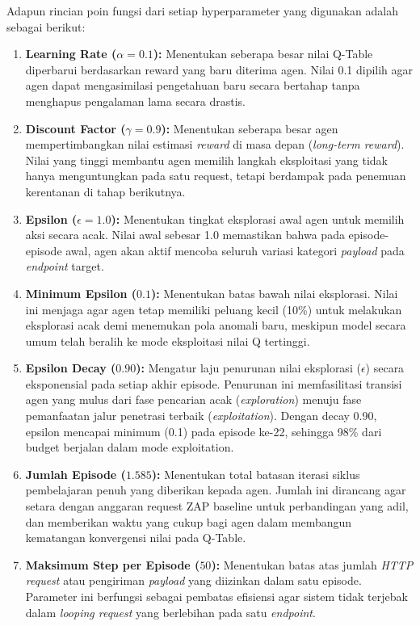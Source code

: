 Adapun rincian poin fungsi dari setiap hyperparameter yang digunakan adalah sebagai berikut:

\begin{enumerate}
    \item \textbf{Learning Rate ($\alpha = 0.1$):} Menentukan seberapa besar nilai Q-Table diperbarui berdasarkan reward yang baru diterima agen. Nilai 0.1 dipilih agar agen dapat mengasimilasi pengetahuan baru secara bertahap tanpa menghapus pengalaman lama secara drastis.
    \item \textbf{Discount Factor ($\gamma = 0.9$):} Menentukan seberapa besar agen mempertimbangkan nilai estimasi \textit{reward} di masa depan (\textit{long-term reward}). Nilai yang tinggi membantu agen memilih langkah eksploitasi yang tidak hanya menguntungkan pada satu request, tetapi berdampak pada penemuan kerentanan di tahap berikutnya.
    \item \textbf{Epsilon ($\epsilon = 1.0$):} Menentukan tingkat eksplorasi awal agen untuk memilih aksi secara acak. Nilai awal sebesar 1.0 memastikan bahwa pada episode-episode awal, agen akan aktif mencoba seluruh variasi kategori \textit{payload} pada \textit{endpoint} target.
    \item \textbf{Minimum Epsilon ($0.1$):} Menentukan batas bawah nilai eksplorasi. Nilai ini menjaga agar agen tetap memiliki peluang kecil (10\%) untuk melakukan eksplorasi acak demi menemukan pola anomali baru, meskipun model secara umum telah beralih ke mode eksploitasi nilai Q tertinggi.
    \item \textbf{Epsilon Decay ($0.90$):} Mengatur laju penurunan nilai eksplorasi ($\epsilon$) secara eksponensial pada setiap akhir episode. Penurunan ini memfasilitasi transisi agen yang mulus dari fase pencarian acak (\textit{exploration}) menuju fase pemanfaatan jalur penetrasi terbaik (\textit{exploitation}). Dengan decay 0.90, epsilon mencapai minimum (0.1) pada episode ke-22, sehingga 98\% dari budget berjalan dalam mode exploitation.
    \item \textbf{Jumlah Episode ($1.585$):} Menentukan total batasan iterasi siklus pembelajaran penuh yang diberikan kepada agen. Jumlah ini dirancang agar setara dengan anggaran request ZAP baseline untuk perbandingan yang adil, dan memberikan waktu yang cukup bagi agen dalam membangun kematangan konvergensi nilai pada Q-Table.
    \item \textbf{Maksimum Step per Episode ($50$):} Menentukan batas atas jumlah \textit{HTTP request} atau pengiriman \textit{payload} yang diizinkan dalam satu episode. Parameter ini berfungsi sebagai pembatas efisiensi agar sistem tidak terjebak dalam \textit{looping request} yang berlebihan pada satu \textit{endpoint}.
\end{enumerate}

